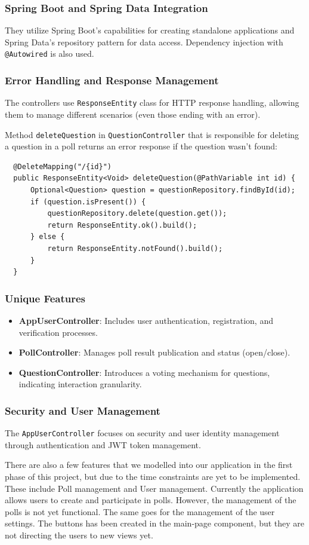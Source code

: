 \subsubsection{Spring Boot and Spring Data Integration}
They utilize Spring Boot's capabilities for creating standalone applications and Spring Data's repository pattern for data access. Dependency injection with \texttt{@Autowired} is also used.

\subsubsection{Error Handling and Response Management}
The controllers use \texttt{ResponseEntity} class for HTTP response handling, allowing them to manage different scenarios (even those ending with an error).

Method \texttt{deleteQuestion} in \texttt{QuestionController} that is responsible for deleting a question in a poll returns an error response if the question wasn't found:
\begin{verbatim}
  @DeleteMapping("/{id}")
  public ResponseEntity<Void> deleteQuestion(@PathVariable int id) {
      Optional<Question> question = questionRepository.findById(id);
      if (question.isPresent()) {
          questionRepository.delete(question.get());
          return ResponseEntity.ok().build();
      } else {
          return ResponseEntity.notFound().build();
      }
  }
\end{verbatim}

\subsubsection{Unique Features}
\begin{itemize}
    \item \textbf{AppUserController}: Includes user authentication, registration, and verification processes.
    \item \textbf{PollController}: Manages poll result publication and status (open/close).
    \item \textbf{QuestionController}: Introduces a voting mechanism for questions, indicating interaction granularity.
\end{itemize}

\subsubsection{Security and User Management}
The \texttt{AppUserController} focuses on security and user identity management through authentication and JWT token management.

\hfill \break

There are also a few features that we modelled into our application in the first phase of this project,
but due to the time constraints are yet to be implemented. These include Poll management and User
management. Currently the application allows users to create and participate in polls. However, the
management of the polls is not yet functional. The same goes for the management of the user
settings. The buttons has been created in the main-page component, but they are not directing the
users to new views yet.